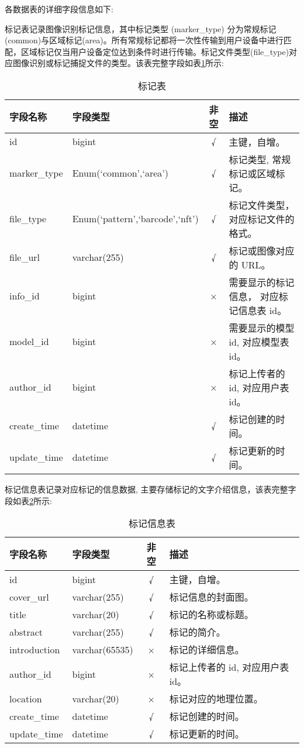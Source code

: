 各数据表的详细字段信息如下:

标记表记录图像识别标记信息，其中标记类型 (marker\_type) 分为常规标记(common)与区域标记(area)。所有常规标记都将一次性传输到用户设备中进行匹配，区域标记仅当用户设备定位达到条件时进行传输。标记文件类型(file\_type)对应图像识别或标记捕捉文件的类型。该表完整字段如表\ref{table:标记表}所示:

\begin{table}[H]
  \centering
  \small
  \caption{标记表}
  \label{table:标记表}
  \setlength{\tabcolsep}{3.7mm}
  \begin{tabular}{l|l|c|l}
    \toprule
    \textbf{字段名称} & \textbf{字段类型} & \textbf{非空} & \textbf{描述} \\
    \midrule
    id & bigint & √ & 主键，自增。 \\
    marker\_type & Enum(`common',`area') & √ & 标记类型, 常规标记或区域标记。 \\
    file\_type & Enum(`pattern',`barcode',`nft') & √ & 标记文件类型，对应标记文件的格式。 \\
    file\_url & varchar(255) & √ & 标记或图像对应的 URL。 \\
    info\_id & bigint & × & 需要显示的标记信息， 对应标记信息表 id。 \\
    model\_id & bigint & × & 需要显示的模型 id, 对应模型表 id。 \\
    author\_id & bigint & × & 标记上传者的 id, 对应用户表 id。 \\
    create\_time & datetime & √ & 标记创建的时间。 \\
    update\_time & datetime & √ & 标记更新的时间。 \\
    \bottomrule
  \end{tabular}
\end{table}

标记信息表记录对应标记的信息数据, 主要存储标记的文字介绍信息，该表完整字段如表\ref{table:标记信息表}所示:

\begin{table}[H]
  \centering
  \small
  \caption{标记信息表}
  \label{table:标记信息表}
  \setlength{\tabcolsep}{8mm}
  \begin{tabular}{l|l|c|l}
    \toprule
    \textbf{字段名称} & \textbf{字段类型} & \textbf{非空} & \textbf{描述} \\
    \midrule
    id & bigint & √ & 主键，自增。 \\
    cover\_url & varchar(255) & √ & 标记信息的封面图。 \\
    title & varchar(20) & √ & 标记的名称或标题。 \\
    abstract& varchar(255) & √ & 标记的简介。 \\
    introduction & varchar(65535) & × & 标记的详细信息。 \\
    author\_id & bigint & × & 标记上传者的 id, 对应用户表 id。 \\
    location & varchar(20) & × & 标记对应的地理位置。 \\
    create\_time & datetime & √ & 标记创建的时间。 \\
    update\_time & datetime & √ & 标记更新的时间。 \\
    \bottomrule
  \end{tabular}
\end{table}


